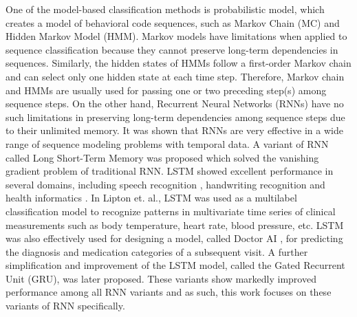 \documentclass{amia_summit_2018}
\begin{document}
One of the model-based classification methods is probabilistic model, which creates a model of behavioral code sequences, such as Markov Chain (MC) and Hidden Markov Model \cite{rabiner1989tutorial} (HMM). Markov models have limitations when applied to sequence classification because they cannot preserve long-term dependencies in sequences. Similarly, the hidden states of HMMs follow a first-order Markov chain and can select only one hidden state at each time step. Therefore, Markov chain and HMMs are usually used for passing one or two preceding step(s) among sequence steps\cite{kundu1988recognition}. On the other hand, Recurrent Neural Networks (RNNs) have no such limitations in preserving long-term dependencies among sequence steps due to their unlimited memory. It was shown that RNNs are very effective in a wide range of sequence modeling problems with temporal data\cite{nion2013handwritten, lipton2015learning, choi2016doctor}. A variant of RNN called Long Short-Term Memory was proposed \cite{graves2013speech} which solved the vanishing gradient problem \cite{bengio1993problem} of traditional RNN. LSTM showed excellent performance in several domains, including speech recognition \cite{graves2013speech}, handwriting recognition \cite{nion2013handwritten} and health informatics \cite{lipton2015learning, choi2016doctor}. In Lipton et. al.\cite{lipton2015learning}, LSTM was used as a multilabel classification model to recognize patterns in multivariate time series of clinical measurements such as body temperature, heart rate, blood pressure, etc. LSTM was also effectively used for designing a model, called Doctor AI \cite{choi2016doctor}, for predicting the diagnosis and medication categories of a subsequent visit. A further simplification and improvement of the LSTM model, called the Gated Recurrent Unit\cite{chung2014empirical} (GRU), was later proposed. These variants show markedly improved performance among all RNN variants and as such, this work focuses on these variants of RNN specifically.       
\end{document}
